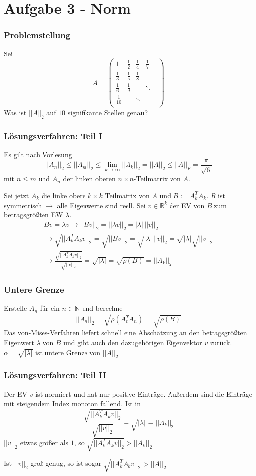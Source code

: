 \documentclass[xcolor = dvipsnames, notheorems, 10pt]{beamer}
\theoremstyle{definition}
\begin{document}
\section{Aufgabe 3 - Norm}
\begin{frame}
\frametitle{Problemstellung}
	Sei
		$$A = \begin{pmatrix}
			1				& \frac{1}{2} 	& \frac{1}{4} 	& \frac{1}{7} 	& \\
			\frac{1}{3}		& \frac{1}{5}	& \frac{1}{8}	& 				& \\
			\frac{1}{6}		& \frac{1}{9}	&				& \ddots		& \\
			\frac{1}{10}	& 				& \ddots		&				& \\
		\end{pmatrix}$$
	Was ist $||A||_2$ auf $10$ signifikante Stellen genau?
\end{frame}
\begin{frame}
\frametitle{Lösungsverfahren: Teil I}
	Es gilt nach Vorlesung $$||A_n||_2 \leq ||A_m||_2 \leq \lim_{k \to \infty} ||A_k||_2 = ||A||_2 \leq ||A||_F = \frac{\pi}{\sqrt{6}}$$
		mit $n \leq m$ und $A_n$ der linken oberen $n\times n$-Teilmatrix von $A$.

	Sei jetzt $A_k$ die linke obere $k \times k$ Teilmatrix von $A$ und $B := A_k^T A_k$.
	$B$ ist symmetrisch $\rightarrow$ alle Eigenwerte sind reell.
	Sei $v \in \mathbb{R}^k$ der EV von $B$ zum betragsgrößten EW $\lambda$.
	\begin{align*}
		Bv = \lambda v \rightarrow ||Bv||_2 = ||\lambda v||_2 = |\lambda| \,||v||_2 \\
		\rightarrow \sqrt{ || A_k^T A_k v||_2 } = \sqrt{ ||B v||_2 } = \sqrt{ |\lambda|\, ||v||_2 } = \sqrt { |\lambda| } \sqrt{ ||v||_2 } \\
		\rightarrow \frac{\sqrt{ || A_k^T A_k v ||_2 }}{\sqrt{ ||v||_2 }} = \sqrt{ |\lambda| } = \sqrt{ \rho(B) } = ||A_k||_2 
	\end{align*}
\end{frame}

\begin{frame}
\frametitle{Untere Grenze}
	Erstelle $A_n$ für ein $n \in \mathbb{N}$ und berechne
	$$ ||A_n||_2 = \sqrt{ \rho(A_n^T A_n) } = \sqrt{ \rho(B) } $$
	Das von-Mises-Verfahren liefert schnell eine Abschätzung an den betragsgrößten Eigenwert $\lambda$ von $B$ und gibt auch den dazugehörigen Eigenvektor $v$ zurück.
	$\alpha = \sqrt{ |\lambda| }$ ist untere Grenze von $||A||_2$
\end{frame}

\begin{frame}
\frametitle{Lösungsverfahren: Teil II}
	Der EV $v$ ist normiert und hat nur positive Einträge. Außerdem sind die Einträge mit steigendem Index monoton fallend. Ist in 
	$$\frac{\sqrt{ || A_k^T A_k v ||_2 }}{\sqrt{ ||v||_2 }} = \sqrt{ |\lambda| } = ||A_k||_2 $$
	$||v||_2$ etwas größer als $1$, so $\sqrt{ || A_k^T A_k v||_2 } > ||A_k||_2$

	Ist $||v||_2$ groß genug, so ist sogar $\sqrt{ || A_k^T A_k v||_2 } > ||A||_2$
\end{frame}
\end{document}
